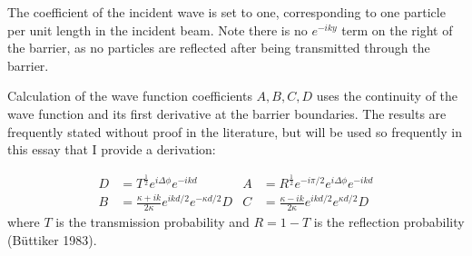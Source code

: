\documentclass{article}
\begin{document}
\noindent The coefficient of the incident wave is set to one, corresponding to one particle per unit length in the incident beam. Note there is no $e^{-iky}$ term on the right of the barrier, as no particles are reflected after being transmitted through the barrier.

\noindent Calculation of the wave function coefficients $A,B,C,D$ uses the continuity of the wave function and its first derivative at the barrier boundaries. The results are frequently stated without proof in the literature, but will be used so frequently in this essay that I provide a derivation:

\begin{align}
	D &= T^{\frac{1}{2}}e^{i\Delta\phi}e^{-ikd} & A &= R^{\frac{1}{2}}e^{-i\pi/2}e^{i\Delta\phi}e^{-ikd} \nonumber \\
	B &= \frac{\kappa+ik}{2\kappa}e^{ikd/2}e^{-\kappa d/2}D & C &= \frac{\kappa-ik}{2\kappa}e^{ikd/2}e^{\kappa d/2}D \label{cont0}
\end{align}
where $T$ is the transmission probability and $R = 1-T$ is the reflection probability (B{\"u}ttiker 1983).
\end{document}
